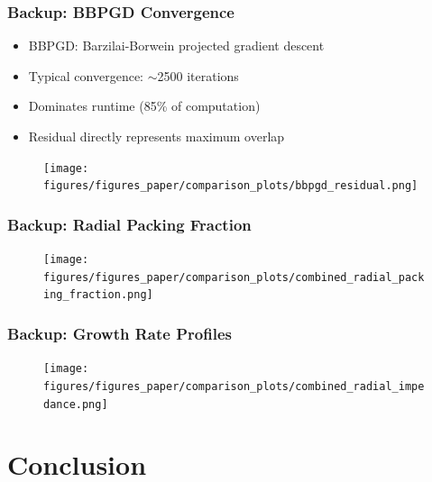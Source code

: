 \documentclass[
	10pt,
	t
]{beamer}
\begin{document}
\begin{frame}
    \frametitle{Backup: BBPGD Convergence}

    \begin{itemize}
        \item BBPGD: Barzilai-Borwein projected gradient descent
        \item Typical convergence: $\sim$2500 iterations
        \item Dominates runtime (85\% of computation)
        \item Residual directly represents maximum overlap
    \end{itemize}

    \vspace{0.2cm}

    \begin{figure}
        \centering
        \texttt{[image: figures/figures\_paper/comparison\_plots/bbpgd\_residual.png]}
    \end{figure}

\end{frame}

\begin{frame}
    \frametitle{Backup: Radial Packing Fraction}

    \begin{figure}
        \centering
        \texttt{[image: figures/figures\_paper/comparison\_plots/combined\_radial\_packing\_fraction.png]}
    \end{figure}

\end{frame}

\begin{frame}
    \frametitle{Backup: Growth Rate Profiles}

    \begin{figure}
        \centering
        \texttt{[image: figures/figures\_paper/comparison\_plots/combined\_radial\_impedance.png]}
    \end{figure}

\end{frame}

\section{Conclusion}
\end{document}

